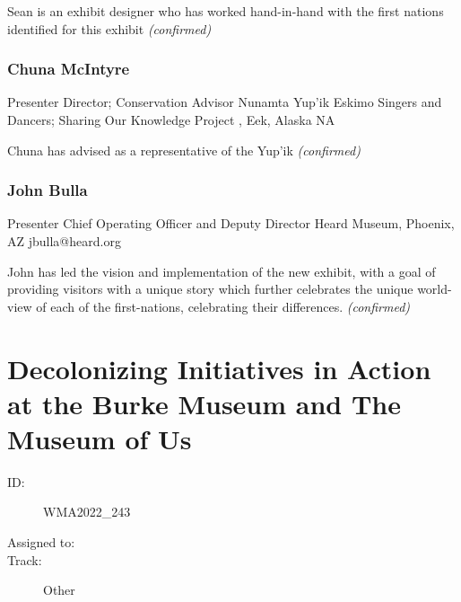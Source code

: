 \documentclass{report}
\begin{document}
                

                Sean is an exhibit designer who has worked hand-in-hand with the first nations identified for this exhibit
                \emph{ (confirmed) }
              

              
                \subsubsection*{ Chuna  McIntyre }
                Presenter\newline
                Director; Conservation Advisor \newline
                Nunamta Yup’ik Eskimo Singers and Dancers; Sharing Our Knowledge Project , Eek, Alaska
                \newline
                NA\newline
                
                

                Chuna has advised as a representative of the Yup’ik
                \emph{ (confirmed) }
              

              
                \subsubsection*{ John  Bulla }
                Presenter\newline
                Chief Operating Officer and Deputy Director\newline
                Heard Museum, Phoenix, AZ
                \newline
                jbulla@heard.org\newline
                
                

                John has led the vision and implementation of the new exhibit, with a goal of providing visitors with a unique story which further celebrates the unique world-view of each of the first-nations, celebrating their differences.
                \emph{ (confirmed) }
              

              
        
          \newpage
          \section{ Decolonizing Initiatives in Action at the Burke Museum and The Museum of Us }
            \begin{description}
              \item [ID:]
              WMA2022\_243

              \item [Assigned to:]
                \item [Track:]Other~
              \end{description}
\end{document}
